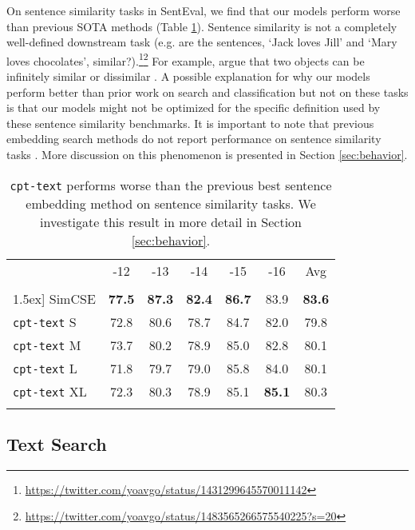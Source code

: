 \documentclass[nohyperref]{article}
\begin{document}
On sentence similarity tasks in SentEval, we find that our models perform worse than previous SOTA methods (Table \ref{table:sts}). Sentence similarity is not a completely well-defined downstream task (e.g. are the sentences, `Jack loves Jill' and `Mary loves chocolates', similar?).\footnote{\url{https://twitter.com/yoavgo/status/1431299645570011142}}\footnote{\url{https://twitter.com/yoavgo/status/1483565266575540225?s=20}} For example, \citet{similarity} argue that two objects can be infinitely similar or dissimilar \cite{Vervaeke2012RelevanceRA}. A possible explanation for why our models perform better than prior work on search and classification but not on these tasks is that our models might not be optimized for the specific definition used by these sentence similarity benchmarks. It is important to note that previous embedding search methods do not report performance on sentence similarity tasks \cite{dpr, e2e, contreiver}.  More discussion on this phenomenon is presented in Section \ref{sec:behavior}.  



\begin{table}[]
\small
\setlength{\tabcolsep}{3pt}
\centering
\begin{tabular}{lcccccc}
\multicolumn{1}{r}{} STS & -12 & -13 & -14 & -15 & -16 & Avg \\ 
\Xhline{2.5\arrayrulewidth}
\multicolumn{7}{c}{Unsupervised} \\ 
\Xhline{1\arrayrulewidth} \-1.5ex]
SimCSE \cite{simcse} & \textbf{77.5} & \textbf{87.3} & \textbf{82.4} & \textbf{86.7} & 83.9 & \textbf{83.6} \\
\texttt{cpt-text} S & 72.8 & 80.6 & 78.7 & 84.7 & 82.0 & 79.8 \\
\texttt{cpt-text} M & 73.7 & 80.2 & 78.9 & 85.0 & 82.8 & 80.1 \\
\texttt{cpt-text} L & 71.8 & 79.7 & 79.0 & 85.8 & 84.0 & 80.1 \\
\texttt{cpt-text} XL & 72.3 & 80.3 & 78.9 & 85.1 & \textbf{85.1} & 80.3 \\
\Xhline{2.5\arrayrulewidth}
\end{tabular}
\caption{\texttt{cpt-text} performs worse than the previous best sentence embedding method on sentence similarity tasks. We investigate this result in more detail in Section \ref{sec:behavior}.}
\label{table:sts}
\end{table}


\subsection{Text Search}
\end{document}
